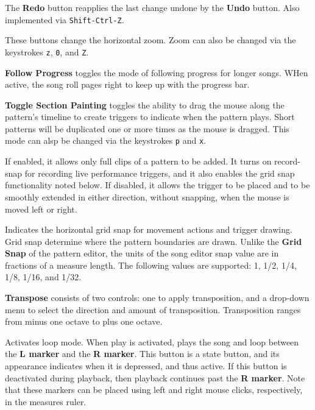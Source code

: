    The \textbf{Redo} button reapplies the last change undone by
   the \textbf{Undo} button.
   Also implemented via \texttt{Shift-Ctrl-Z}.

   These buttons change the horizontal zoom.
   Zoom can also be changed via the keystrokes \texttt{z}, \texttt{0},
   and \texttt{Z}.

   \textbf{Follow Progress} toggles the mode of following progress
   for longer songs.  WHen active, the song roll pages right to keep up with
   the progress bar.

   \textbf{Toggle Section Painting} toggles the ability
   to drag the mouse along the pattern's timeline to create triggers
   to indicate when the pattern plays.
   Short patterns will be duplicated one or more times as
   the mouse is dragged.
   This mode can alsp be changed via the keystrokes \texttt{p} and
   \texttt{x}.

   If enabled, it allows only full clips of a pattern to be added.
   It turns on record-snap for recording live performance triggers,
   and it also enables the grid snap functionality noted below.
   If disabled, it allows the trigger to be placed and to be smoothly extended
   in either direction, without snapping, when the mouse is moved left or
   right.

   Indicates the horizontal grid snap for movement actions and trigger drawing.
   Grid snap determine where the pattern boundaries are drawn.
   Unlike the \textbf{Grid Snap} of the pattern editor, the units
   of the song editor snap value are in fractions of a measure length.
   The following values are supported:
   1, 1/2, 1/4, 1/8, 1/16, and 1/32.

   \textbf{Transpose} consists of two controls: one to apply
   transposition, and a drop-down menu to select the direction and amount
   of transposition.
   Transposition ranges from minus one octave to plus one octave.

   Activates loop mode. When play is activated, plays the song and loop
   between the
   \textbf{L marker} and the \textbf{R marker}.
   This button is a state button, and its appearance indicates when it is
   depressed, and thus active.
   If this button is deactivated during playback, then playback
   continues past the \textbf{R marker}.
   Note that these markers can be placed using left
   and right mouse clicks, respectively, in the measures ruler.


